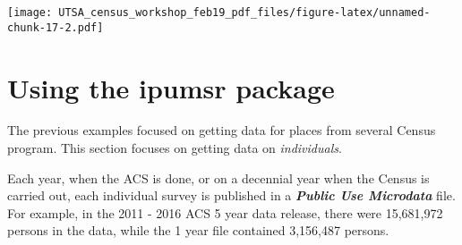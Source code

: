 \documentclass[]{article}
\newenvironment{Shaded}{\begin{snugshade}}{\end{snugshade}}
\newcommand{\KeywordTok}[1]{\textcolor[rgb]{0.13,0.29,0.53}{\textbf{#1}}}
\newcommand{\DataTypeTok}[1]{\textcolor[rgb]{0.13,0.29,0.53}{#1}}
\newcommand{\DecValTok}[1]{\textcolor[rgb]{0.00,0.00,0.81}{#1}}
\newcommand{\StringTok}[1]{\textcolor[rgb]{0.31,0.60,0.02}{#1}}
\newcommand{\OperatorTok}[1]{\textcolor[rgb]{0.81,0.36,0.00}{\textbf{#1}}}
\newcommand{\NormalTok}[1]{#1}
\begin{document}
\begin{Shaded}
\end{Shaded}

\texttt{[image: UTSA\_census\_workshop\_feb19\_pdf\_files/figure-latex/unnamed-chunk-17-2.pdf]}

\newpage

\section{Using the ipumsr package}\label{using-the-ipumsr-package}

The previous examples focused on getting data for places from several
Census program. This section focuses on getting data on
\emph{individuals}.

Each year, when the ACS is done, or on a decennial year when the Census
is carried out, each individual survey is published in a
\textbf{\emph{Public Use Microdata}} file. For example, in the 2011 -
2016 ACS 5 year data release, there were 15,681,972 persons in the data,
while the 1 year file contained 3,156,487 persons.
\end{document}
